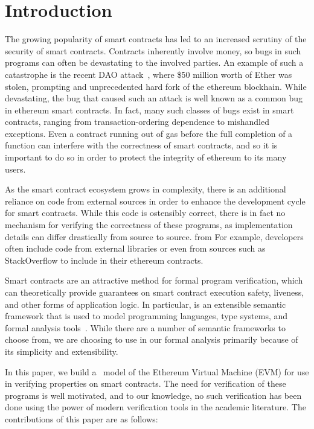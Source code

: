 \section{Introduction}
The growing popularity of smart contracts has led to an increased scrutiny of
the security of smart contracts. Contracts inherently involve money, so bugs in
such programs can often be devastating to the involved parties. An example of
such a catastrophe is the recent DAO attack~\cite{dao-attack}, where \$50
million worth of Ether was stolen, prompting and unprecedented hard fork of the
ethereum blockhain. While devastating, the bug that caused such an attack is
well known as a common bug in ethereum smart contracts. In fact, many such
classes of bugs exist in smart contracts, ranging from transaction-ordering
dependence to mishandled exceptions. Even a contract running out of gas before
the full completion of a function can interfere with the correctness of smart
contracts, and so it is important to do so in order to protect the integrity of
ethereum to its many users.

As the smart contract ecosystem grows in complexity, there is an additional
reliance on code from external sources in order to enhance the development cycle
for smart contracts. While this code is ostensibly correct, there is in fact no
mechanism for verifying the correctness of these programs, as implementation
details can differ drastically from source to source. from For example,
developers often include code from external libraries or even from sources such as
StackOverflow to include in their ethereum contracts.

Smart contracts are an attractive method for formal program verification, which
can theoretically provide guarantees on smart contract execution safety,
liveness, and other forms of application logic. In particular, \K{} is an
extensible semantic framework that is used to model programming languages, type
systems, and formal analysis tools~\cite{rosu-serbanuta-2010-jlap}. While there
are a number of semantic frameworks to choose from, we are choosing to use \K{} in
our formal analysis primarily because of its simplicity and extensibility.

In this paper, we build a \K{}~model of the Ethereum Virtual Machine (EVM) for use
in verifying properties on smart contracts. The need for verification of these
programs is well motivated, and to our knowledge, no such verification has been
done using the power of modern verification tools in the academic literature.
The contributions of this paper are as follows:

